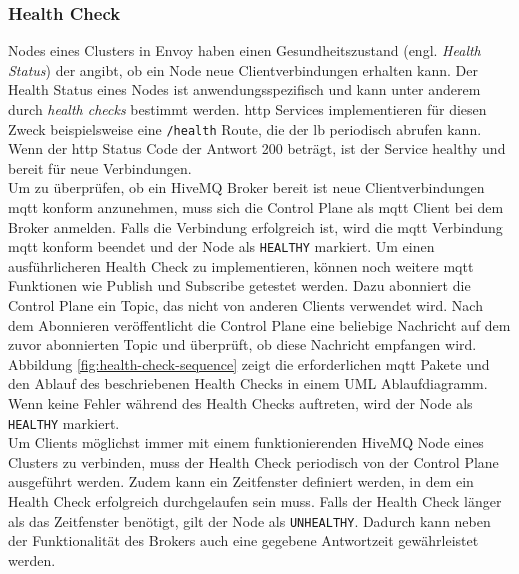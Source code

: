 \subsubsection{Health Check} \label{ss:health-check}
Nodes eines Clusters in Envoy haben einen Gesundheitszustand (engl. \textit{Health Status}) der angibt, ob ein Node neue Clientverbindungen erhalten kann.
Der Health Status eines Nodes ist anwendungsspezifisch und kann unter anderem durch \textit{health checks} bestimmt werden.
\ac{http} Services implementieren für diesen Zweck beispielsweise eine \verb|/health| Route, die der \acl{lb} periodisch abrufen kann. Wenn der \ac{http} Status Code der Antwort 200 beträgt, ist der Service healthy und bereit für neue Verbindungen.
\\
Um zu überprüfen, ob ein HiveMQ Broker bereit ist neue Clientverbindungen \ac{mqtt} konform anzunehmen, muss sich die Control Plane als \ac{mqtt} Client bei dem Broker anmelden.
Falls die Verbindung erfolgreich ist, wird die \ac{mqtt} Verbindung \ac{mqtt} konform beendet und der Node als \verb|HEALTHY| markiert.
Um einen ausführlicheren Health Check zu implementieren, können noch weitere \ac{mqtt} Funktionen wie Publish und Subscribe getestet werden. Dazu abonniert die Control Plane ein Topic, das nicht von anderen Clients verwendet wird. Nach dem Abonnieren veröffentlicht die Control Plane eine beliebige Nachricht auf dem zuvor abonnierten Topic und überprüft, ob diese Nachricht empfangen wird. Abbildung \ref{fig:health-check-sequence} zeigt die erforderlichen \ac{mqtt} Pakete und den Ablauf des beschriebenen Health Checks in einem UML Ablaufdiagramm. Wenn keine Fehler während des Health Checks auftreten, wird der Node als \verb|HEALTHY| markiert.
\\
Um Clients möglichst immer mit einem funktionierenden HiveMQ Node eines Clusters zu verbinden, muss der Health Check periodisch von der Control Plane ausgeführt werden.
Zudem kann ein Zeitfenster definiert werden, in dem ein Health Check erfolgreich durchgelaufen sein muss.
Falls der Health Check länger als das Zeitfenster benötigt, gilt der Node als \verb|UNHEALTHY|. Dadurch kann neben der Funktionalität des Brokers auch eine gegebene Antwortzeit gewährleistet werden.

